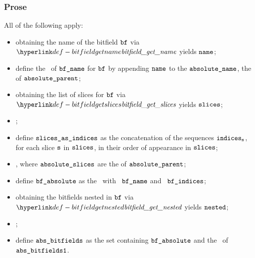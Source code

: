 \subsubsection{Prose}
All of the following apply:
\begin{itemize}
  \item obtaining the name of the bitfield $\texttt{bf}$ via $\bitfieldgetname$ yields $\texttt{name}$;
  \item define the \absolutename\ of $\texttt{bf\_name}$ for $\texttt{bf}$ by appending $\texttt{name}$ to the $\texttt{absolute\_name}$, the \absolutename{} of $\texttt{absolute\_parent}$;
  \item obtaining the list of slices for $\texttt{bf}$ via $\bitfieldgetslices$ yields $\texttt{slices}$;
  \item \Proseslicetoindices{$\tenv$}{$\vs$}{$\indices_\vs$};
  \item define $\vslicesasindices$ as the concatenation of the sequences $\indices_\vs$,
        for each slice $\vs$ in $\texttt{slices}$, in their order of appearance in $\texttt{slices}$;
  \item \Prosesliceindicesbyslices{$\vabsslices$}{$\vslicesasindices$}{$\vbfindices$}, where $\vabsslices$ are the \absoluteslices{} of $\texttt{absolute\_parent}$;
  \item define $\vbfabsolute$ as the \absolutebitfield\ with \absolutename\ $\texttt{bf\_name}$
        and \absoluteslices\ $\vbfindices$;
  \item obtaining the bitfields nested in $\texttt{bf}$ via $\bitfieldgetnested$ yields $\vnested$;
  \item \Prosebitfieldstoabsolute{$\tenv$}{$\vnested$}{$\vbfabsolute$}{$\vabsbitfieldsone$};
  \item define $\texttt{abs\_bitfields}$ as the set containing $\vbfabsolute$ and the \absolutebitfields\
        of $\vabsbitfieldsone$.
\end{itemize}


